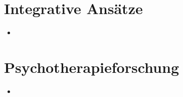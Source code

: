 \documentclass[11pt, paper=a4, twocolumn]{scrartcl}
\begin{document}
	\section{Integrative Ansätze}
		\begin{itemize}
			\item 
		\end{itemize}

	\section{Psychotherapieforschung}
		\begin{itemize}
			\item 
		\end{itemize}
\end{document}
